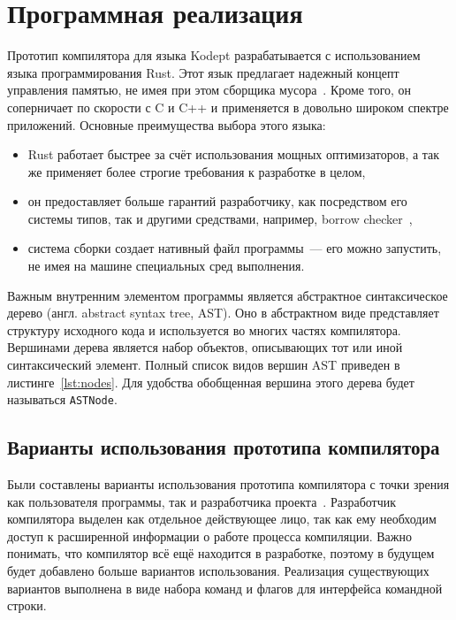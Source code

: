 \chapter{Программная реализация}
\label{ch:chap3_soft_architecture}


Прототип компилятора для языка Kodept разрабатывается с использованием языка программирования Rust.
Этот язык предлагает надежный концепт управления памятью, не имея при этом сборщика мусора~\cite{RustMemory}.
Кроме того, он соперничает по скорости с C и C++ и применяется в довольно широком спектре приложений.
Основные преимущества выбора этого языка:
\begin{itemize}
    \item Rust работает быстрее за счёт использования мощных оптимизаторов, а так же применяет более строгие требования к разработке в целом,
    \item он предоставляет больше гарантий разработчику, как посредством его системы типов, так и другими средствами, например, borrow checker~\cite{RustBchk},
    \item система сборки создает нативный файл программы~--- его можно запустить, не имея на машине специальных сред выполнения.
\end{itemize}

Важным внутренним элементом программы является абстрактное синтаксическое дерево (англ. abstract syntax tree, AST).
Оно в абстрактном виде представляет структуру исходного кода и используется во многих частях компилятора.
Вершинами дерева является набор объектов, описывающих тот или иной синтаксический элемент.
Полный список видов вершин AST приведен в листинге~\ref{lst:nodes}.
Для удобства обобщенная вершина этого дерева будет называться \lstinline{ASTNode}.

\section{Варианты использования прототипа компилятора}
\label{sec:usage}

Были составлены варианты использования прототипа компилятора с точки зрения как пользователя программы, так и разработчика проекта~.
Разработчик компилятора выделен как отдельное действующее лицо, так как ему необходим доступ к расширенной информации о работе процесса компиляции.
Важно понимать, что компилятор всё ещё находится в разработке, поэтому в будущем будет добавлено больше вариантов использования.
Реализация существующих вариантов выполнена в виде набора команд и флагов для интерфейса командной строки.

